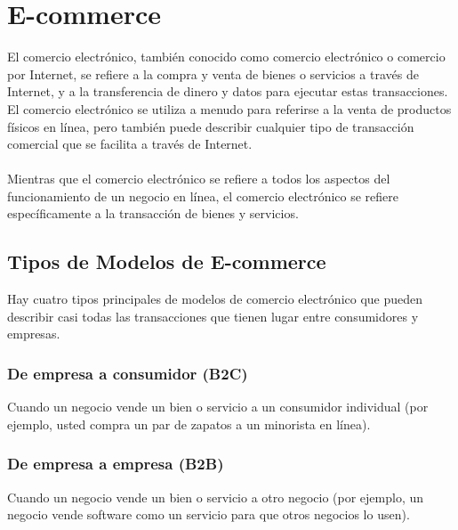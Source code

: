 \documentclass[12pt,letterpaper]{article}
\begin{document}
\newpage
\section{E-commerce}
El comercio electrónico, también conocido como comercio electrónico o comercio por Internet, 
se refiere a la compra y venta de bienes o servicios a través de Internet, y a la 
transferencia de dinero y datos para ejecutar estas transacciones. El comercio electrónico 
se utiliza a menudo para referirse a la venta de productos físicos en línea, pero también 
puede describir cualquier tipo de transacción comercial que se facilita a través de Internet.
\\ \\
Mientras que el comercio electrónico se refiere a todos los aspectos del funcionamiento de 
un negocio en línea, el comercio electrónico se refiere específicamente a la transacción de 
bienes y servicios.

\subsection{Tipos de Modelos de E-commerce}
Hay cuatro tipos principales de modelos de comercio electrónico que pueden describir casi 
todas las transacciones que tienen lugar entre consumidores y empresas.

\subsubsection{De empresa a consumidor (B2C)}
Cuando un negocio vende un bien o servicio a un consumidor individual (por ejemplo, usted 
compra un par de zapatos a un minorista en línea).

\subsubsection{De empresa a empresa (B2B)} 
Cuando un negocio vende un bien o servicio a otro negocio (por ejemplo, un negocio vende 
software como un servicio para que otros negocios lo usen).  


\end{document}
